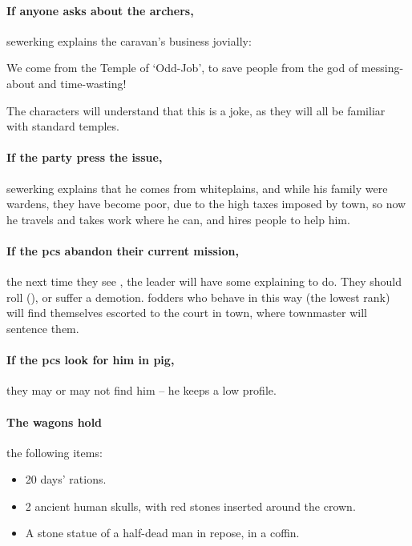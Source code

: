\paragraph{If anyone asks about the archers,}
\gls{sewerking} explains the caravan's business jovially:

\null
\begin{speechtext}
  We come from the Temple of `Odd-Job', to save people from the god of messing-about and time-wasting!
\end{speechtext}

The characters will understand that this is a joke, as they will all be familiar with standard temples.

\paragraph{If the party press the issue,}
\gls{sewerking} explains that he comes from \gls{whiteplains}, and while his family were \glspl{warden}, they have become poor, due to the high taxes imposed by \gls{town}, so now he travels and takes work where he can, and hires people to help him.

\paragraph{If the \glspl{pc} abandon their current mission,}
the next time they see , the leader will have some explaining to do.
They should roll  (\tn[12]), or suffer a demotion.
\Glspl{fodder} who behave in this way (the lowest rank) will find themselves escorted to the \gls{court} in \gls{town}, where \gls{townmaster} will sentence them.

\paragraph{If the \glspl{pc} look for him in \gls{pig},}
they may or may not find him -- he keeps a low profile.

\paragraph{The wagons hold}
the following items:

\null
\begin{itemize}
  \item
  20 days' \glspl{ration}.
  \item
  2 ancient human skulls, with red stones inserted around the crown.
  \label{skullCrown}
  \item
  A stone statue of a half-dead man in repose, in a coffin.
\end{itemize}

